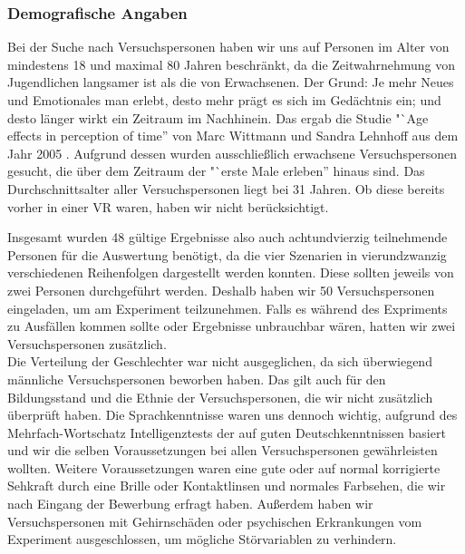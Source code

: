 \documentclass{Bericht}
\begin{document}
\subsubsection{Demografische Angaben}
Bei der Suche nach Versuchspersonen haben wir uns auf Personen im Alter von mindestens 18 und maximal 80 Jahren beschränkt, da die Zeitwahrnehmung von Jugendlichen langsamer ist als die von Erwachsenen. Der Grund: Je mehr Neues und Emotionales man erlebt, desto mehr prägt es sich im Gedächtnis ein; und desto länger wirkt ein Zeitraum im Nachhinein. Das ergab die Studie "`Age effects in perception of time'' von Marc Wittmann und Sandra Lehnhoff aus dem Jahr 2005 \cite{AgeEffects}. Aufgrund dessen wurden ausschließlich erwachsene Versuchspersonen gesucht, die über dem Zeitraum der "`erste Male erleben'' hinaus sind. Das Durchschnittsalter aller Versuchspersonen liegt bei 31 Jahren. Ob diese bereits vorher in einer VR waren, haben wir nicht berücksichtigt.

Insgesamt wurden 48 gültige Ergebnisse also auch achtundvierzig teilnehmende Personen für die Auswertung benötigt, da die vier Szenarien in vierundzwanzig verschiedenen Reihenfolgen dargestellt werden konnten. Diese sollten jeweils von zwei Personen durchgeführt werden. Deshalb haben wir 50 Versuchspersonen eingeladen, um am Experiment teilzunehmen. Falls es während des Expriments zu Ausfällen kommen sollte oder Ergebnisse unbrauchbar wären, hatten wir zwei Versuchspersonen zusätzlich. \\

Die Verteilung der Geschlechter war nicht ausgeglichen, da sich überwiegend männliche Versuchspersonen beworben haben. Das gilt auch für den Bildungsstand und die Ethnie der Versuchspersonen, die wir nicht zusätzlich überprüft haben. Die Sprachkenntnisse waren uns dennoch wichtig, aufgrund des Mehrfach-Wortschatz Intelligenztests der auf guten Deutschkenntnissen basiert und wir die selben Voraussetzungen bei allen Versuchspersonen gewährleisten wollten. Weitere Voraussetzungen waren eine gute oder auf normal korrigierte Sehkraft durch eine Brille oder Kontaktlinsen und normales Farbsehen, die wir nach Eingang der Bewerbung erfragt haben. Außerdem haben wir Versuchspersonen mit Gehirnschäden oder psychischen Erkrankungen vom Experiment ausgeschlossen, um mögliche Störvariablen zu verhindern. 
\end{document}
